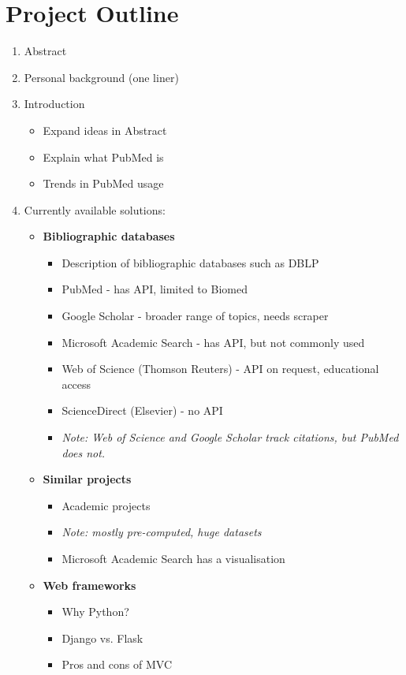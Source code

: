 \documentclass[a4paper,12pt]{article}
\begin{document}
\section{Project Outline}
\begin{enumerate}
	\item Abstract
	\item Personal background (one liner)
	\item Introduction
	\begin{itemize}
		\item Expand ideas in Abstract
		\item Explain what PubMed is
		\item Trends in PubMed usage
		\end{itemize}
	\item Currently available solutions:
	\begin{itemize}
		\item \textbf{Bibliographic databases}
		\begin{itemize}
			\item Description of bibliographic databases such as DBLP
			\item PubMed - has API, limited to Biomed
			\item Google Scholar - broader range of topics, needs scraper
			\item Microsoft Academic Search - has API, but not commonly used
			\item Web of Science (Thomson Reuters) - API on request, educational access
			\item ScienceDirect (Elsevier) - no API
			\item \emph{Note: Web of Science and Google Scholar track citations, but PubMed does not.}
		\end{itemize}
		\item \textbf{Similar projects}
		\begin{itemize}
			\item Academic projects 
			\item \emph{Note: mostly pre-computed, huge datasets}
			\item Microsoft Academic Search has a visualisation
		\end{itemize}
		\item \textbf{Web frameworks}
		\begin{itemize}
			\item Why Python?
			\item Django vs. Flask
			\item Pros and cons of MVC

\end{itemize}
\end{itemize}
\end{enumerate}
\end{document}
